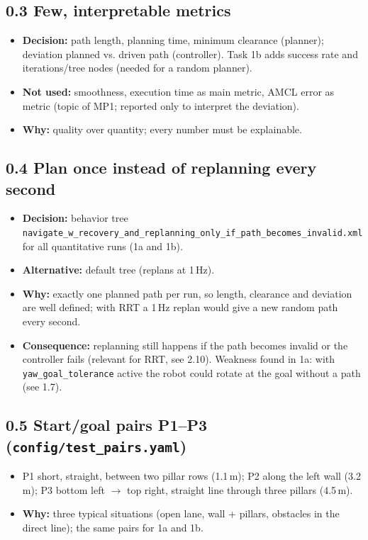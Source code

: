 \documentclass[10pt]{article}
\newcommand{\pkg}[1]{\texttt{#1}}
\begin{document}
\subsection*{0.3 Few, interpretable metrics}
\begin{itemize}
  \item \textbf{Decision:} path length, planning time, minimum clearance (planner); deviation planned vs. driven path (controller). Task 1b adds success rate and iterations/tree nodes (needed for a random planner).
  \item \textbf{Not used:} smoothness, execution time as main metric, AMCL error as metric (topic of MP1; reported only to interpret the deviation).
  \item \textbf{Why:} quality over quantity; every number must be explainable.
\end{itemize}

\subsection*{0.4 Plan once instead of replanning every second}
\begin{itemize}
  \item \textbf{Decision:} behavior tree \pkg{navigate\_w\_recovery\_and\_replanning\_only\_if\_path\_becomes\_invalid.xml} for all quantitative runs (1a and 1b).
  \item \textbf{Alternative:} default tree (replans at 1\,Hz).
  \item \textbf{Why:} exactly one planned path per run, so length, clearance and deviation are well defined; with RRT a 1\,Hz replan would give a new random path every second.
  \item \textbf{Consequence:} replanning still happens if the path becomes invalid or the controller fails (relevant for RRT, see 2.10). Weakness found in 1a: with \pkg{yaw\_goal\_tolerance} active the robot could rotate at the goal without a path (see 1.7).
\end{itemize}

\subsection*{0.5 Start/goal pairs P1--P3 (\pkg{config/test\_pairs.yaml})}
\begin{itemize}
  \item P1 short, straight, between two pillar rows (1.1\,m); P2 along the left wall (3.2\,m); P3 bottom left $\rightarrow$ top right, straight line through three pillars (4.5\,m).
  \item \textbf{Why:} three typical situations (open lane, wall + pillars, obstacles in the direct line); the same pairs for 1a and 1b.
\end{itemize}
\end{document}

